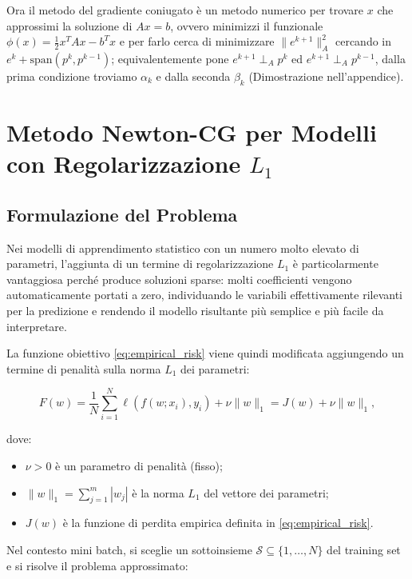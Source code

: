 \documentclass[italian, a4paper, twoside, binding=6mm]{sapthesis}
\begin{document}
Ora il metodo del gradiente coniugato è un metodo numerico per trovare \(x\) che approssimi la soluzione di \(Ax = b\), ovvero minimizzi il funzionale $
\phi(x) = \frac{1}{2}x^T A x - b^T x$
e per farlo cerca di minimizzare \(\|e^{k+1}\|_A^2\) cercando in \(e^k + \text{span}(p^k, p^{k-1})\); equivalentemente pone \(e^{k+1} \perp_A p^k\) ed \(e^{k+1} \perp_A p^{k-1}\), dalla prima condizione troviamo \(\alpha_k\) e dalla seconda \(\beta_k\) (Dimostrazione nell'appendice).
\newpage

\section{Metodo Newton-CG per Modelli con Regolarizzazione $L_1$}\label{sec:l1}

\subsection{Formulazione del Problema}

Nei modelli di apprendimento statistico con un numero molto elevato di parametri,
l'aggiunta di un termine di regolarizzazione $L_1$ è particolarmente vantaggiosa
perché produce soluzioni sparse: molti coefficienti vengono
automaticamente portati a zero, individuando le variabili effettivamente
rilevanti per la predizione e rendendo il modello risultante più semplice e
più facile da interpretare.

La funzione obiettivo \eqref{eq:empirical_risk} viene quindi modificata aggiungendo un termine di
penalità sulla norma $L_1$ dei parametri:

\begin{equation}
F(w) = \frac{1}{N}\sum_{i=1}^{N} \ell(f(w;x_i),y_i) + \nu \|w\|_1 = J(w) + \nu \|w\|_1, \tag{5.41}
\end{equation}

dove:
\begin{itemize}
    \item $\nu > 0$ è un parametro di penalità (fisso);
    \item $\|w\|_1 = \sum_{j=1}^{m} |w_j|$ è la norma $L_1$ del vettore dei parametri;
    \item $J(w)$ è la funzione di perdita empirica definita in \eqref{eq:empirical_risk}.
\end{itemize}

Nel contesto mini batch, si sceglie un sottoinsieme $\mathcal{S} \subseteq \{1,\dots,N\}$
del training set e si risolve il problema approssimato:
\end{document}
